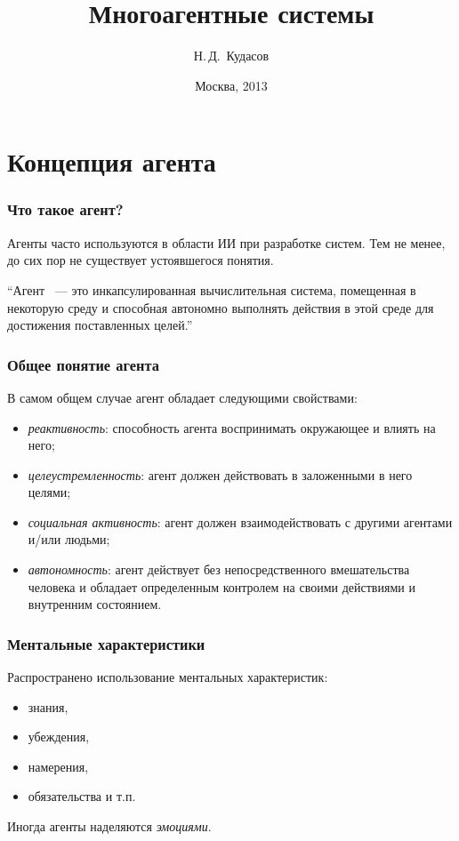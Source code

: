 \documentclass{beamer}
\begin{document}
\title[]{Многоагентные системы}
\author{Н.\,Д.~Кудасов}
\date{Москва, 2013}

\begin{frame}
\addtocounter{framenumber}{-1}
\maketitle
\end{frame}

\section{Концепция агента}

\begin{frame}
  \frametitle{Что такое агент?}
  Агенты часто используются в области ИИ при разработке систем.
  Тем не менее, до сих пор не существует устоявшегося понятия.

  \begin{exampleblock}{}
    {\large ``Агент ~--- это инкапсулированная вычислительная система,
    помещенная в некоторую среду и способная автономно выполнять действия
    в этой среде для достижения поставленных целей.''}
    \vskip5mm
    \hspace*{}
  \end{exampleblock}

\end{frame}

\begin{frame}
  \frametitle{Общее понятие агента}
  В самом общем случае агент обладает следующими свойствами:

  \begin{itemize}
    \item<1-> {\it реактивность}: способность агента воспринимать окружающее и влиять на него;
    \item<2-> {\it целеустремленность}: агент должен действовать в заложенными в него целями;
    \item<3-> {\it социальная активность}: агент должен взаимодействовать с другими агентами и/или людьми;
    \item<4-> {\it автономность}: агент действует без непосредственного вмешательства человека и обладает
      определенным контролем на своими действиями и внутренним состоянием.
  \end{itemize}
\end{frame}

\begin{frame}
  \frametitle{Ментальные характеристики}
  Распространено использование ментальных характеристик:

  \begin{itemize}
    \item знания,
    \item убеждения,
    \item намерения,
    \item обязательства и т.п.
  \end{itemize}

  Иногда агенты наделяются {\it эмоциями}.
\end{frame}
\end{document}
